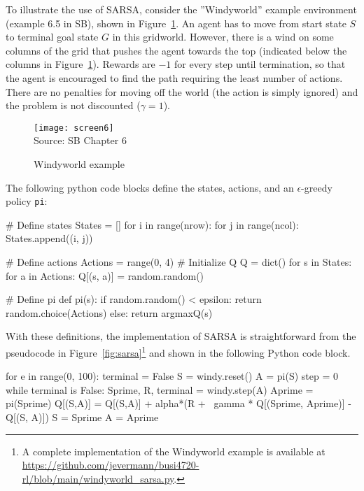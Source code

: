 To illustrate the use of SARSA, consider the ''Windyworld'' example environment (example 6.5 in SB), shown in Figure~\ref{fig:windyworld}. An agent has to move from start state $S$ to terminal goal state $G$ in this gridworld. However, there is a wind on some columns of the grid that pushes the agent towards the top (indicated below the columns in Figure~\ref{fig:windyworld}). Rewards are $-1$ for every step until termination, so that the agent is encouraged to find the path requiring the least number of actions. There are no penalties for moving off the world (the action is simply ignored) and the problem is not discounted ($\gamma=1$).


\begin{figure}
\centering
\texttt{[image: screen6]} \\
\scriptsize Source: SB Chapter 6 \normalsize 
\caption{Windyworld example}
\label{fig:windyworld}
\end{figure}

The following python code blocks define the states, actions, and an $\epsilon$-greedy policy \texttt{pi}:

\begin{pythoncode}
# Define states
States = []
for i in range(nrow):
    for j in range(ncol):
        States.append((i, j))

# Define actions
Actions = range(0, 4)
# Initialize Q
Q = dict()
for s in States:
    for a in Actions:
        Q[(s, a)] = random.random()

# Define pi
def pi(s):
    if random.random() < epsilon:
        return random.choice(Actions)
    else:
        return argmaxQ(s)
\end{pythoncode}

With these definitions, the implementation of SARSA is straightforward from the pseudocode in Figure~\ref{fig:sarsa}\footnote{A complete implementation of the Windyworld example is available at \url{https://github.com/jevermann/busi4720-rl/blob/main/windyworld_sarsa.py}.} and shown in the following Python code block.

\begin{pythoncode}
for e in range(0, 100):
    terminal = False
    S = windy.reset()
    A = pi(S)
    step = 0
    while terminal is False:
        Sprime, R, terminal = windy.step(A)
        Aprime = pi(Sprime)
        Q[(S,A)] = Q[(S,A)] + alpha*(R + \
            gamma * Q[(Sprime, Aprime)] - Q[(S, A)])
        S = Sprime
        A = Aprime
\end{pythoncode}

